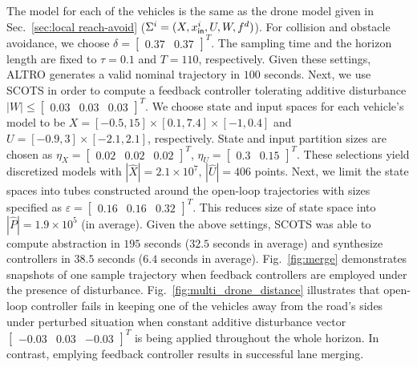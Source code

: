 The model for each of the vehicles is the same as the drone model given in Sec.~\ref{sec:local reach-avoid} ($\Sigma^i=(X,x_{\mathsf{in}}^i,U,W,f^d)$). For collision and obstacle avoidance, we choose $\delta=\begin{bmatrix}0.37&0.37\end{bmatrix}^T$. The sampling time and the horizon length are fixed to $\tau=0.1$ and $T=110$, respectively. Given these settings, ALTRO generates a valid nominal trajectory in $100$ seconds. Next, we use SCOTS in order to compute a feedback controller tolerating additive disturbance $|W|\leq\begin{bmatrix}0.03&0.03&0.03\end{bmatrix}^T$. We choose state and input spaces for each vehicle's model to be $X=[-0.5,15]\times[0.1,7.4]\times[-1,0.4]$ and $U=[-0.9,3]\times[-2.1,2.1]$, respectively. State and input partition sizes are chosen as $\eta_{X}=\begin{bmatrix}0.02&0.02&0.02\end{bmatrix}^T$, $\eta_{U}=\begin{bmatrix}0.3&0.15\end{bmatrix}^T$. These selections yield discretized models with $|\hat X|=2.1\times 10^7$, $|\hat U|=406$ points. Next, we limit the state spaces into tubes constructed around the open-loop trajectories with sizes specified as $\varepsilon=\begin{bmatrix}0.16&0.16&0.32\end{bmatrix}^T$. This reduces size of state space into $|\hat P|=1.9\times 10^5$ (in average). Given the above settings, SCOTS was able to compute abstraction in $195$ seconds ($32.5$ seconds in average) and synthesize controllers in $38.5$ seconds ($6.4$ seconds in average). Fig.~\ref{fig:merge} demonstrates snapshots of one sample trajectory when feedback controllers are employed under the presence of disturbance. Fig.~\ref{fig:multi_drone_distance} illustrates that open-loop controller fails in keeping one of the vehicles away from the road's sides under perturbed situation when constant additive disturbance vector $\begin{bmatrix}-0.03 &0.03&-0.03\end{bmatrix}^T$ is being applied throughout the whole horizon. In contrast, emplying feedback controller results in successful lane merging. %